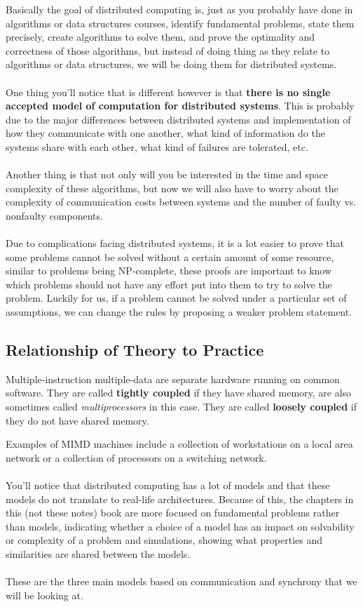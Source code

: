 \documentclass[12pt]{article}
\begin{document}
Basically the goal of distributed computing is, just as you probably have done in algorithms or data structures courses, identify fundamental problems, state them precisely, create algorithms to solve them, and prove the optimality and correctness of those algorithms, but instead of doing thing as they relate to algorithms or data structures, we will be doing them for distributed systems.\\
\\
One thing you'll notice that is different however is that \textbf{there is no single accepted model of computation for distributed systems}. This is probably due to the major differences between distributed systems and implementation of how they communicate with one another, what kind of information do the systems share with each other, what kind of failures are tolerated, etc.\\
\\
Another thing is that not only will you be interested in the time and space complexity of these algorithms, but now we will also have to worry about the complexity of communication costs between systems and the number of faulty vs. nonfaulty components.\\
\\
Due to complications facing distributed systems, it is a lot easier to prove that some problems cannot be solved without a certain amount of some resource, similar to problems being NP-complete, these proofs are important to know which problems should not have any effort put into them to try to solve the problem. Luckily for us, if a problem cannot be solved under a particular set of assumptions, we can change the rules by proposing a weaker problem statement.

\subsection{Relationship of Theory to Practice}

\begin{tcolorbox}[title=Definition: Multiple-instruction multiple-data (MIMD)]
	Multiple-instruction multiple-data are separate hardware running on common software. They are called \textbf{tightly coupled} if they have shared memory, are also sometimes called \textit{multiprocessors} in this case. They are called \textbf{loosely coupled} if they do not have shared memory.
\end{tcolorbox}

Examples of MIMD machines include a collection of workstations on a local area network or a collection of processors on a switching network.\\
\\
You'll notice that distributed computing has a lot of models and that these models do not translate to real-life architectures. Because of this, the chapters in this (not these notes) book are more focused on fundamental problems rather than models, indicating whether a choice of a model has an impact on solvability or complexity of a problem and simulations, showing what properties and similarities are shared between the models.\\
\\
These are the three main models based on communication and synchrony that we will be looking at.
\end{document}
